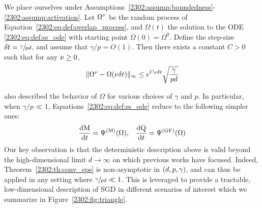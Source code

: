 \begin{theorem}  \label{2302:th:conv_eps} We place ourselves under Assumptions~\ref{2302:assump:boundedness}-\ref{2302:assump:activation}. Let $\Omega^\nu$ be the random process of Equation~\eqref{2302:eq:def:overlap_process}, and $\Omega(t)$ the solution to the ODE \eqref{2302:eq:def:ss_ode} with starting point $\Omega(0) = \Omega^0$. Define the step-size $\delta t = \sfrac{\gamma}{pd}$, and assume that $\gamma / p = O(1)$.
Then there exists a constant $C > 0$ such that for any $\nu \geq 0$,
\begin{equation}
    \lVert \Omega^{\nu} - \Omega(\nu\delta t) \rVert_\infty \leq e^{C\nu \delta t} \sqrt{\frac{\gamma}{pd}}
\end{equation}
\end{theorem}

\cite{veiga2022phase} also described the behavior of $\Omega$ for various choices of $\gamma$ and $p$. In particular, when $\gamma / p \ll 1$, Equations~\eqref{2302:eq:def:ss_ode} reduce to the following simpler ones:
\begin{align}
\label{2302:eq:def:gf_ode}
\frac{\text{d}\mathrm{M}}{\text{d} t} = \Psi^{(\mathrm{M})}(\Omega), && 
\frac{\text{d}\mathrm{Q}}{\text{d} t} =  \Psi^{(\mathrm{GF})}(\Omega)
\end{align}
Our key observation is that the deterministic description above is valid beyond the high-dimensional limit $d\to\infty$ on which previous works \citep{saad1995line,goldt2019dynamics,veiga2022phase} have focused. Indeed, Theorem~\ref{2302:th:conv_eps} is non-asymptotic in $(d,p,\gamma)$, and can thus be applied in any setting where $\sfrac{\gamma}{pd} \ll 1$. This is leveraged to provide a tractable, low-dimensional description of SGD in different scenarios of interest which we summarize in Figure~\ref{2302:fig:triangle}. 

